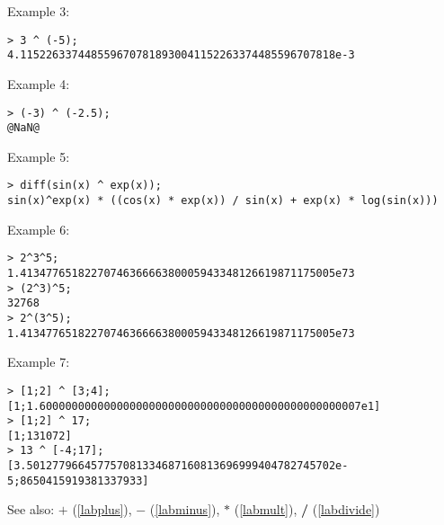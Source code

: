 \noindent Example 3: 
\begin{center}\begin{minipage}{15cm}\begin{Verbatim}[frame=single]
> 3 ^ (-5);
4.1152263374485596707818930041152263374485596707818e-3
\end{Verbatim}
\end{minipage}\end{center}
\noindent Example 4: 
\begin{center}\begin{minipage}{15cm}\begin{Verbatim}[frame=single]
> (-3) ^ (-2.5);
@NaN@
\end{Verbatim}
\end{minipage}\end{center}
\noindent Example 5: 
\begin{center}\begin{minipage}{15cm}\begin{Verbatim}[frame=single]
> diff(sin(x) ^ exp(x));
sin(x)^exp(x) * ((cos(x) * exp(x)) / sin(x) + exp(x) * log(sin(x)))
\end{Verbatim}
\end{minipage}\end{center}
\noindent Example 6: 
\begin{center}\begin{minipage}{15cm}\begin{Verbatim}[frame=single]
> 2^3^5;
1.4134776518227074636666380005943348126619871175005e73
> (2^3)^5;
32768
> 2^(3^5);
1.4134776518227074636666380005943348126619871175005e73
\end{Verbatim}
\end{minipage}\end{center}
\noindent Example 7: 
\begin{center}\begin{minipage}{15cm}\begin{Verbatim}[frame=single]
> [1;2] ^ [3;4];
[1;1.60000000000000000000000000000000000000000000000007e1]
> [1;2] ^ 17;
[1;131072]
> 13 ^ [-4;17];
[3.501277966457757081334687160813696999404782745702e-5;8650415919381337933]
\end{Verbatim}
\end{minipage}\end{center}
See also: \textbf{$+$} (\ref{labplus}), \textbf{$-$} (\ref{labminus}), \textbf{$*$} (\ref{labmult}), \textbf{/} (\ref{labdivide})
